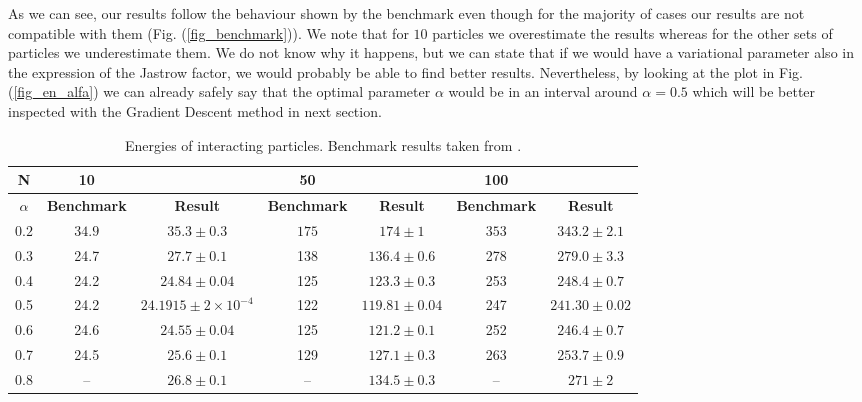 As we can see, our results follow the behaviour shown by the benchmark even though for the majority of cases our results are not compatible with them (Fig. (\ref{fig_benchmark})). We note that for $10$ particles we overestimate the results whereas for the other sets of particles we underestimate them. We do not know why it happens, but we can state that if we would have a variational parameter also in the expression of the Jastrow factor, we would probably be able to find better results. 
Nevertheless, by looking at the plot in Fig. (\ref{fig_en_alfa}) we can already safely say that the optimal parameter $\alpha$ would be in an interval around $\alpha=0.5$ which will be better inspected with the Gradient Descent method in next section.


\begin{table}[H]
\caption{Energies of interacting particles. Benchmark results taken from \cite{giovanni}.}
\centering
\begin{tabular}{ c c c c c c  c}
\textbf{N}& \hfill \textbf{10} & &\hfill \textbf{50}& & \hfill \textbf{100} \\ \hline
\textbf{$\alpha$}  & \textbf{Benchmark} & \textbf{Result} & \textbf{Benchmark} & \textbf{Result}  &\textbf{Benchmark} & \textbf{Result}\\\hline 
$0.2$ & $34.9$ &  $35.3\pm 0.3$ & $175$ & $174\pm 1$ &  $353$   & $343.2\pm 2.1$\\ 
0.3 & 24.7 & $27.7\pm 0.1$ & 138 & $136.4\pm 0.6$ &  278   & $279.0\pm 3.3$\\
0.4 & 24.2 & $24.84\pm 0.04 $ & 125 & $123.3\pm 0.3$ &  253   & $248.4\pm 0.7$\\
0.5 & 24.2 &$24.1915\pm 2\times 10^{-4}$ & 122 & $119.81\pm 0.04$ &  247   &$241.30\pm 0.02 $\\
0.6 & 24.6 &$24.55\pm 0.04$ & 125 & $121.2\pm 0.1$ &  252   &$246.4\pm 0.7$\\
0.7 & 24.5 & $25.6\pm 0.1$& 129 & $127.1\pm 0.3$ &  263  &$253.7\pm 0.9$\\
0.8 & -- & $26.8\pm 0.1$& --  & $134.5\pm 0.3$& -- & $271\pm 2$ \\ 
\end{tabular}
\label{tab_energies_inter}
\end{table} 

